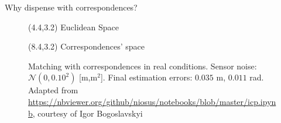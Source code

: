 \begin{frame}[noframenumbering]{Why dispense with correspondences?}

  \begin{figure}\vspace{1cm}
    \caption{Matching with correspondences in real conditions. Sensor noise:
             $\mathcal{N}(0, 0.10^2)$ [m,m$^2$]. Final estimation errors:
             $0.035$ m, $0.011$ rad. Adapted from
             \url{https://nbviewer.org/github/niosus/notebooks/blob/master/icp.ipynb},
              courtesy of Igor Bogoslavskyi}
    \begin{textblock}{3}(4.4,3.2)
      \scriptsize Euclidean Space
    \end{textblock}
    \begin{textblock}{4}(8.4,3.2)
      \scriptsize Correspondences' space
    \end{textblock}
  \end{figure}

\end{frame}
